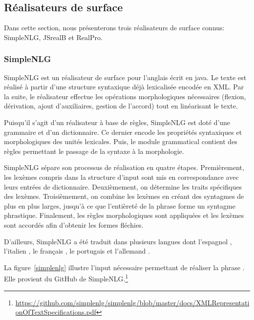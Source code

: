 
\subsection{Réalisateurs de surface}

Dans cette section, nous présenterons trois réalisateurs de surface connus: SimpleNLG, JSrealB et RealPro.

\subsubsection{SimpleNLG}
SimpleNLG \citep{GattSimpleNLGRealisationEngine2009} est un réalisateur de surface pour l'anglais écrit en java. Le texte est réalisé à partir d'une structure syntaxique déjà lexicalisée encodée en XML. Par la suite, le réalisateur effectue les opérations morphologiques nécessaires (flexion, dérivation, ajout d'auxiliaires, gestion de l'accord) tout en linéarisant le texte.

Puisqu'il s'agit d'un réalisateur à base de règles, SimpleNLG est doté d'une grammaire et d'un dictionnaire. Ce dernier encode les propriétés syntaxiques et morphologiques des unités lexicales. Puis, le module grammatical contient des règles permettant le passage de la syntaxe à la morphologie.

SimpleNLG sépare son processus de réalisation en quatre étapes. Premièrement, les lexèmes compris dans la structure d'input sont mis en correspondance avec leurs entrées de dictionnaire. Deuxièmement, on détermine les traits spécifiques des lexèmes. Troisièmement, on combine les lexèmes en créant des syntagmes de plus en plus larges, jusqu'à ce que l'entièreté de la phrase forme un syntagme phrastique. Finalement, les règles morphologiques sont appliquées et les lexèmes sont accordés afin d'obtenir les formes fléchies.

D'ailleurs, SimpleNLG a été traduit dans plusieurs langues dont l'espagnol \citep{RamosSotoAdaptingSimpleNLGSpanish2017}, l'italien \citep{MazzeiSimpleNLGITadaptingSimpleNLG2016}, le français \citep{VaudryAdaptingSimpleNLGBilingual2013}, le portugais \citep{deOliveiraAdaptingSimpleNLGBrazilian2014} et l'allemand \citep{BollmannAdaptingSimpleNLGGerman2011}.

La figure~\ref{simplenlg} illustre l'input nécessaire permettant de réaliser la phrase . Elle provient du GitHub de SimpleNLG.\footnote{\url{https://github.com/simplenlg/simplenlg/blob/master/docs/XMLRepresentationOfTextSpecifications.pdf}}

